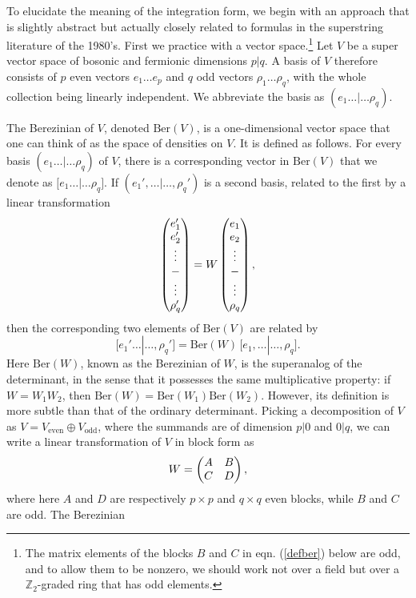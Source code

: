 \documentclass[11pt,a4paper]{article}
\def\[{\bigl [}
\def\]{\bigr ]}
\def\Z{{\mathbb Z}}
\def\Ber{{\mathrm {Ber}}}
\begin{document}
To elucidate the meaning of the integration form, we  begin with an approach that is slightly abstract but
actually closely related to formulas in the superstring literature of the 1980's.
First we practice with a vector space.\footnote{The matrix elements of the blocks $B$ and $C$ in eqn. (\ref{defber}) below are odd,
and to allow them to be nonzero, we should work not over a field but over a $\Z_2$-graded ring that has odd elements.}
Let $V$ be a super vector space of bosonic and fermionic dimensions $p|q$.
A basis of $V$ therefore consists of $p$ even vectors $e_1\dots e_p$ and $q$ odd vectors $\rho_1\dots\rho_q$, with the whole collection being
linearly independent.   We abbreviate the basis as $(e_1\dots|\dots\rho_q)$.

The Berezinian of $V$, denoted $\Ber(V)$, is a one-dimensional vector space that one can think of as the space of densities on $V$.  It is defined as follows.
For every basis $(e_1\dots|\dots\rho_q)$ of $V$, there is a corresponding vector in $\Ber(V)$ that we denote as  $\[e_1\dots|\dots\rho_q\]$.
If $(e_1',\dots|\dots,\rho_q')$ is a second basis, related to the first by a linear transformation
\begin{equation}\label{odexo}\begin{pmatrix}e_1'\cr e_2'\cr \vdots \cr - \cr \vdots \cr \rho'_q\end{pmatrix} =
W \begin{pmatrix}e_1\cr e_2\cr \vdots \cr - \cr \vdots \cr \rho_q\end{pmatrix},\end{equation}
then the corresponding two elements of $\Ber(V)$ are related by
\begin{equation}\label{dexo}\[e_1'\dots|\dots,\rho_q'\]=\Ber(W)\,\[e_1,\dots|\dots,\rho_q\].\end{equation}
Here $\Ber(W)$, known as the Berezinian of $W$, is the superanalog of the determinant, in the sense that it possesses the
same multiplicative property: if $W=W_1W_2$, then $\Ber(W)=\Ber(W_1)\Ber(W_2)$.  However, its definition is more subtle than that of the ordinary
determinant. Picking a decomposition of $V$ as $V=V_{\mathrm{even}}\oplus V_{\mathrm{odd}}$, where the summands are of dimension $p|0$ and $0|q$,
we can write a linear transformation of $V$ in block form as 
\begin{equation}\label{defber} W=\begin{pmatrix} A & B\cr C & D\end{pmatrix},\end{equation}
where here $A$ and $D$ are respectively $p\times p$ and $q\times q$ even blocks, while $B$ and $C$ are odd.  The Berezinian
\end{document}
